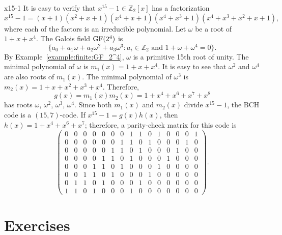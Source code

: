 \begin{example}{x15-1}
It is easy to verify that $x^{15} - 1 \in {\mathbb Z}_2[x]$ has a
factorization
\[
x^{15} - 1 = (x + 1)(x^2 + x + 1)(x^4 + x + 1)(x^4 + x^3 + 1)(x^4 +
x^3 + x^2 + x + 1),
\]
where each of the factors is an irreducible polynomial.
Let $\omega$ be a root of $1 + x + x^4$. The Galois field $\operatorname{GF}(2^4)$ is
\[
\{
a_0 + a_1 \omega + a_2 \omega^2 + a_3 \omega^3 : a_i \in {\mathbb Z}_2
\mbox{ and } 1 + \omega + \omega^4 = 0
\}.
\]
By Example~\ref{example:finite:GF_2^4}, $\omega$ is a primitive 15th root of unity. The
minimal polynomial of $\omega$ is $m_1(x) = 1 + x + x^4$. It is easy
to see that $\omega^2$ and $\omega^4$ are also roots of $m_1(x)$. The
minimal polynomial of $\omega^3$ is $m_2(x) = 1 + x + x^2 + x^3 +
x^4$. Therefore, 
\[
g(x) = m_1(x) m_2(x) = 1 + x^4 + x^6 + x^7 + x^8
\]
has roots $\omega$, $\omega^2$, $\omega^3$, $\omega^4$.  Since both $m_1(x)$
and $m_2(x)$ divide $x^{15} - 1$, the BCH code is a $(15, 7)$-code. If
$x^{15} -1 = g(x)h(x)$, then $h(x) = 1 + x^4 + x^6 + x^7$; therefore,
a parity-check matrix for this code is
\[
\left( %
\begin{array}{ccccccccccccccc}
0 & 0 & 0 & 0 & 0 & 0 & 0 & 1 & 1 & 0 & 1 & 0 & 0 & 0 & 1 \\
0 & 0 & 0 & 0 & 0 & 0 & 1 & 1 & 0 & 1 & 0 & 0 & 0 & 1 & 0 \\
0 & 0 & 0 & 0 & 0 & 1 & 1 & 0 & 1 & 0 & 0 & 0 & 1 & 0 & 0 \\
0 & 0 & 0 & 0 & 1 & 1 & 0 & 1 & 0 & 0 & 0 & 1 & 0 & 0 & 0 \\
0 & 0 & 0 & 1 & 1 & 0 & 1 & 0 & 0 & 0 & 1 & 0 & 0 & 0 & 0 \\
0 & 0 & 1 & 1 & 0 & 1 & 0 & 0 & 0 & 1 & 0 & 0 & 0 & 0 & 0 \\
0 & 1 & 1 & 0 & 1 & 0 & 0 & 0 & 1 & 0 & 0 & 0 & 0 & 0 & 0 \\
1 & 1 & 0 & 1 & 0 & 0 & 0 & 1 & 0 & 0 & 0 & 0 & 0 & 0 & 0
\end{array}
\right).
\]
\end{example}


 
\section*{Exercises}
\exrule

